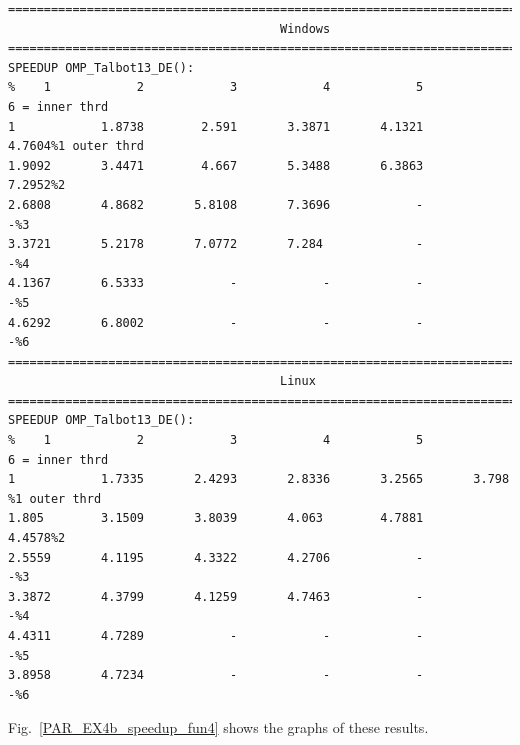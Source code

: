 \documentclass[a4paper,10pt]{report}%
\begin{document}
\begin{lstlisting}
====================================================================================
                                      Windows
====================================================================================
SPEEDUP OMP_Talbot13_DE():
%    1            2            3            4            5            6 = inner thrd
1            1.8738        2.591       3.3871       4.1321       4.7604%1 outer thrd
1.9092       3.4471        4.667       5.3488       6.3863       7.2952%2
2.6808       4.8682       5.8108       7.3696            -            -%3
3.3721       5.2178       7.0772       7.284             -            -%4
4.1367       6.5333            -            -            -            -%5
4.6292       6.8002            -            -            -            -%6
====================================================================================
                                      Linux
====================================================================================
SPEEDUP OMP_Talbot13_DE():
%    1            2            3            4            5            6 = inner thrd
1            1.7335       2.4293       2.8336       3.2565       3.798 %1 outer thrd
1.805        3.1509       3.8039       4.063        4.7881       4.4578%2
2.5559       4.1195       4.3322       4.2706            -            -%3
3.3872       4.3799       4.1259       4.7463            -            -%4
4.4311       4.7289            -            -            -            -%5
3.8958       4.7234            -            -            -            -%6
\end{lstlisting}
Fig.~\ref{PAR_EX4b_speedup_fun4} shows the graphs of these results.
\end{document}
